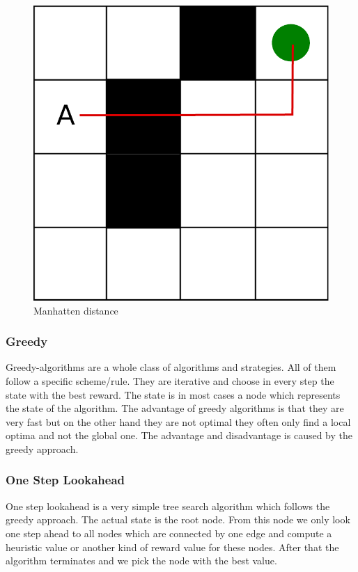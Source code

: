 \begin{figure}

\centering
\includegraphics[scale=0.3]{images/manhatten.pdf}
\caption{Manhatten distance}
\label{fig:manhatten}
\end{figure}



\subsubsection{Greedy}

Greedy-algorithms are a whole class of algorithms and strategies. All of them follow a specific scheme/rule. They are iterative and choose in every step the state with the best reward. The state is in most cases a node which represents the state of the algorithm. The advantage of greedy algorithms is that they are very fast but on the other hand they are not optimal they often only find a local optima and not the global one. The advantage and disadvantage is caused by the greedy approach.  

\subsubsection{One Step Lookahead}

One step lookahead is a very simple tree search algorithm which follows the greedy approach. The actual state is the root node. From this node we only look one step ahead to all nodes which are connected by one edge and compute a heuristic value or another kind of reward value for these nodes. After that the algorithm terminates and we pick the node with the best value.

